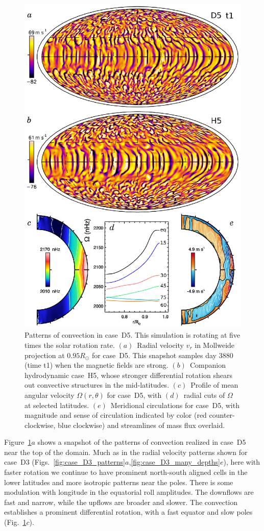 \begin{figure}
  \begin{center}
    \includegraphics[width=0.7\linewidth]{figs/chapter_6/Figure_6/Figure_6.eps}
  \end{center}
  \caption[Patterns of convection in case~D5]
     {Patterns of convection in case~D5.  This simulation is rotating
     at five times the solar rotation rate.  
     $(a)$~Radial velocity $v_r$ in Mollweide projection at
     $0.95R_\odot$ for case~D5. This snapshot samples day 3880 (time t1)
     when the magnetic fields are strong.  $(b)$~Companion hydrodynamic
     case~H5, whose stronger differential rotation shears out convective
     structures in the mid-latitudes.  $(c)$~Profile of mean angular
     velocity $\Omega(r,\theta)$ for case~D5, with $(d)$~radial cuts of
     $\Omega$ at selected latitudes.  $(e)$~Meridional circulations for
     case~D5, with magnitude and sense of circulation indicated by color
     (red counter-clockwise, blue clockwise) and streamlines of mass flux
     overlaid.
  \label{fig:case_D5_patterns}}
\end{figure}

Figure~\ref{fig:case_D5_patterns}$a$ shows a snapshot of the patterns
of convection realized in case~D5 near the top of the domain.
Much as in the radial velocity patterns shown for case~D3 
(Figs.~\ref{fig:case_D3_patterns}$a$,\ref{fig:case_D3_many_depths}$e$),
here with faster rotation we continue to have prominent
north-south aligned cells in the lower latitudes and more isotropic
patterns near the poles.  There is some modulation with longitude in
the equatorial roll amplitudes.  The downflows are fast and narrow,
while the upflows are broader and slower.  The convection establishes
a prominent differential rotation, with a fast equator and slow poles
(Fig.~\ref{fig:case_D5_patterns}$c$).

